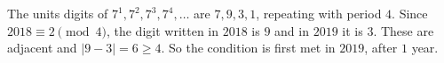 The units digits of $7^1,7^2,7^3,7^4,\dots$ are $7,9,3,1$, repeating with period $4$. Since $2018\equiv2\pmod4$, the digit written in $2018$ is $9$ and in $2019$ it is $3$. These are adjacent and $|9-3|=6\ge4$. So the condition is first met in $2019$, after $\boxed{1}$ year.
